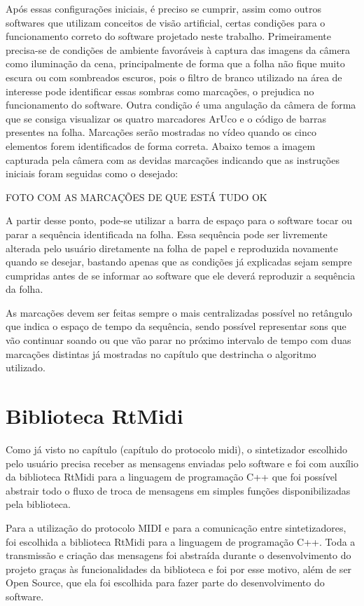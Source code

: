 \documentclass[12pt]{report}
\begin{document}
Após essas configurações iniciais, é preciso se cumprir, assim como outros softwares que utilizam conceitos de visão artificial, certas condições para o funcionamento correto do software projetado neste trabalho.
Primeiramente precisa-se de condições de ambiente favoráveis à captura das imagens da câmera como iluminação da cena, principalmente de forma que a folha não fique muito escura ou com sombreados escuros, pois o filtro de branco utilizado na área de interesse pode identificar essas sombras como marcações, o prejudica no funcionamento do software. Outra condição é uma angulação da câmera de forma que se consiga visualizar os quatro marcadores ArUco e o código de barras presentes na folha. Marcações serão mostradas no vídeo quando os cinco elementos forem identificados de forma correta. Abaixo temos a imagem capturada pela câmera com as devidas marcações indicando que as instruções iniciais foram seguidas como o desejado:

FOTO COM AS MARCAÇÕES DE QUE ESTÁ TUDO OK

A partir desse ponto, pode-se utilizar a barra de espaço para o software tocar ou parar a sequência identificada na folha. Essa sequência pode ser livremente alterada pelo usuário diretamente na folha de papel e reproduzida novamente quando se desejar, bastando apenas que as condições já explicadas sejam sempre cumpridas antes de se informar ao software que ele deverá reproduzir a sequência da folha.

As marcações devem ser feitas sempre o mais centralizadas possível no retângulo que indica o espaço de tempo da sequência, sendo possível representar sons que vão continuar soando ou que vão parar no próximo intervalo de tempo com duas marcações distintas já mostradas no capítulo que destrincha o algoritmo utilizado.

\chapter{Biblioteca RtMidi}

Como já visto no capítulo (capítulo do protocolo midi), o sintetizador escolhido pelo usuário precisa receber as mensagens enviadas pelo software e foi com auxílio da biblioteca RtMidi para a linguagem de programação C++ que foi possível abstrair todo o fluxo de troca de mensagens em simples funções disponibilizadas pela biblioteca.

Para a utilização do protocolo MIDI e para a comunicação entre sintetizadores, foi escolhida a biblioteca RtMidi para a linguagem de programação C++. Toda a transmissão e criação das mensagens foi abstraída durante o desenvolvimento do projeto graças às funcionalidades da biblioteca e foi por esse motivo, além de ser Open Source, que ela foi escolhida para fazer parte do desenvolvimento do software.
\end{document}
